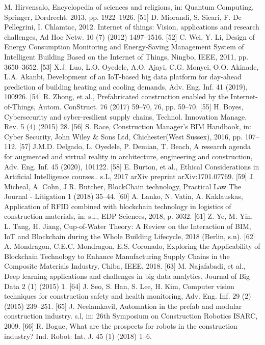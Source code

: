 \documentclass[towcolumn, 11pt]{Article}
\begin{document}
\begin{چکیده}
[50] M. Hirvensalo, Encyclopedia of sciences and religions, in: Quantum Computing, Springer, Dordrecht, 2013, pp. 1922–1926. 
[51] D. Miorandi, S. Sicari, F. De Pellegrini, I. Chlamtac, 2012. Internet of things: Vision, applications and research challenges, Ad Hoc Netw. 10 (7) (2012) 1497–1516. 
[52] C. Wei, Y. Li, Design of Energy Consumption Monitoring and Energy-Saving Management System of Intelligent Building Based on the Internet of Things, Ningbo, IEEE, 2011, pp. 3650–3652. 
[53] X.J. Luo, L.O. Oyedele, A.O. Ajayi, C.G. Monyei, O.O. Akinade, L.A. Akanbi, Development of an IoT-based big data platform for day-ahead prediction of building heating and cooling demands, Adv. Eng. Inf. 41 (2019), 100926. 
[54] R. Zhong, et al., Prefabricated construction enabled by the Internet-of-Things, Autom. ConStruct. 76 (2017) 59–70, 76, pp. 59–70. 
[55] H. Boyes, Cybersecurity and cyber-resilient supply chains, Technol. Innovation Manage. Rev. 5 (4) (2015) 28. 
[56] S. Race, Construction Manager’s BIM Handbook, in: Cyber Security, John Wiley & Sons Ltd, Chichester(West Sussex), 2016, pp. 107–112. 
[57] J.M.D. Delgado, L. Oyedele, P. Demian, T. Beach, A research agenda for augmented and virtual reality in architecture, engineering and construction, Adv. Eng. Inf. 45 (2020), 101122. 
[58] E. Burton, et al., Ethical Considerations in Artificial Intelligence courses.. s.L, 2017 arXiv preprint arXiv:1701.07769. 
[59] J. Micheal, A. Cohn, J.R. Butcher, BlockChain technology, Practical Law The Journal - Litigation 1 (2018) 35–44. 
[60] A. Lanko, N. Vatin, A. Kaklauskas, Application of RFID combined with blockchain technology in logistics of construction materials, in: s.l., EDP Sciences, 2018, p. 3032. 
[61] Z. Ye, M. Yin, L. Tang, H. Jiang, Cup-of-Water Theory: A Review on the Interaction of BIM, IoT and Blockchain during the Whole Building Lifecycle, 2018 (Berlin, s.n). 
[62] A. Mondragon, C.E.C. Mondragon, E.S. Coronado, Exploring the Applicability of Blockchain Technology to Enhance Manufacturing Supply Chains in the Composite Materials Industry, Chiba, IEEE, 2018. 
[63] M. Najafabadi, et al., Deep learning applications and challenges in big data analytics, Journal of Big Data 2 (1) (2015) 1. 
[64] J. Seo, S. Han, S. Lee, H. Kim, Computer vision techniques for construction safety and health monitoring, Adv. Eng. Inf. 29 (2) (2015) 239–251. 
[65] J. Neelamkavil, Automation in the prefab and modular construction industry. s.l, in: 26th Symposium on Construction Robotics ISARC, 2009. 
[66] R. Bogue, What are the prospects for robots in the construction industry? Ind. Robot: Int. J. 45 (1) (2018) 1–6. 

\end{چکیده}
\end{document}
